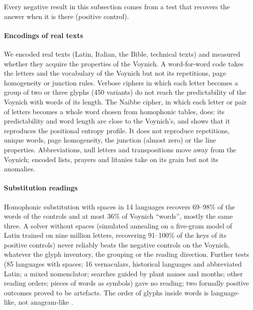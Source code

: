 Every negative result in this subsection comes from a test that recovers the answer when it is there (positive control).

\paragraph{Encodings of real texts} We encoded real texts (Latin, Italian, the Bible, technical texts) and measured
whether they acquire the properties of the Voynich. A word-for-word code takes the letters and the vocabulary of the
Voynich but not its repetitions, page homogeneity or junction rules. Verbose ciphers in which each letter becomes a group
of two or three glyphs (450 variants) do not reach the predictability of the Voynich with words of its length. The
Naibbe cipher, in which each letter or pair of letters becomes a whole word chosen from homophonic tables, does: its
predictability and word length are close to the Voynich's, and \citet{kinnison2026} shows that it reproduces the
positional entropy profile. It does not reproduce repetitions, unique words, page homogeneity, the junction (almost zero)
or the line properties. Abbreviations, null letters and transpositions move away from the Voynich; encoded lists,
prayers and litanies take on its grain but not its anomalies.

\paragraph{Substitution readings} Homophonic substitution with spaces in 14 languages recovers 69--98\% of the words of
the controls and at most 36\% of Voynich ``words'', mostly the same three. A solver without spaces (simulated annealing
on a five-gram model of Latin trained on nine million letters, recovering 91--100\% of the keys of its positive
controls) never reliably beats the negative controls on the Voynich, whatever the glyph inventory, the grouping or the
reading direction. Further tests (85 languages with spaces; 16 vernaculars, historical languages and abbreviated Latin;
a mixed nomenclator; searches guided by plant names and months; other reading orders; pieces of words as symbols) gave
no reading; two formally positive outcomes proved to be artefacts. The order of glyphs inside words is language-like,
not anagram-like \citep[compare][]{hauerkondrak2016}.

